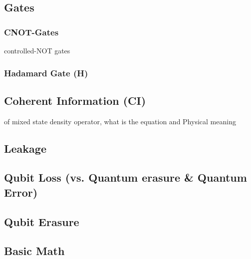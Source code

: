 \documentclass{article}
\begin{document}
\subsection{Gates}
\subsubsection{CNOT-Gates}
controlled-NOT gates
\subsubsection{Hadamard Gate (H)}

\subsection{Coherent Information (CI)}
of mixed state density operator, what is the equation and Physical meaning 

\subsection{Leakage}

\subsection{Qubit Loss (vs. Quantum erasure \& Quantum Error)}
\subsection{Qubit Erasure}

\subsection{Basic Math}
\end{document}
